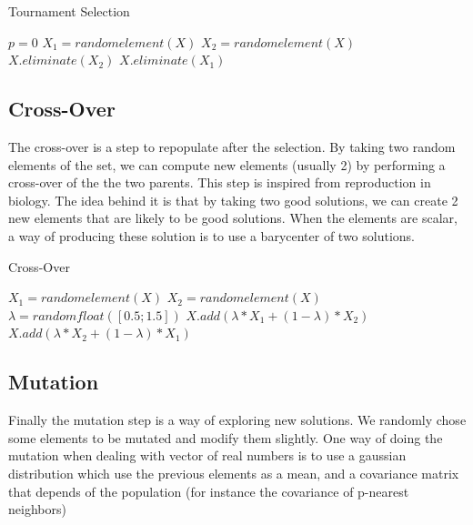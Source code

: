 \begin{algorithm}
    \caption{Tournament Selection}
    \begin{algorithmic}
    \STATE $ p = 0 $
            \STATE $ X_1 = random element(X) $ 
            \STATE $ X_2 = random element(X) $
                \STATE $X.eliminate(X_2)$
            \ELSE
                \STATE $X.eliminate(X_1)$
            \ENDIF
        \ENDWHILE
    
    \end{algorithmic}
\end{algorithm}

\subsection{Cross-Over}
    The cross-over is a step to repopulate after the selection. By taking two random elements of the set, we can compute new elements (usually 2) by performing a cross-over of the the two parents. This step is inspired from reproduction in biology. The idea behind it is that by taking two good solutions, we can create 2 new elements that are likely to be good solutions. When the elements are scalar, a way of producing these solution is to use a barycenter of two solutions. 

\begin{algorithm}
    \caption{Cross-Over}

    \begin{algorithmic}
            \STATE $X_1 = random element(X)$
            \STATE $X_2 = random element(X)$
            \STATE $\lambda = random float([0.5; 1.5])$
            \STATE $X.add (\lambda * X_1 + ( 1 - \lambda) * X_2)$
            \STATE $X.add (\lambda * X_2 + ( 1 - \lambda) * X_1)$
    \ENDFOR
    \end{algorithmic}
\end{algorithm}


\subsection{Mutation}
    Finally the mutation step is a way of exploring new solutions. We randomly chose some elements to be mutated and modify them slightly. One way of doing the mutation when dealing with vector of real numbers is to use a gaussian distribution which use the previous elements as a mean, and a covariance matrix that depends of the population (for instance the covariance of p-nearest neighbors)


